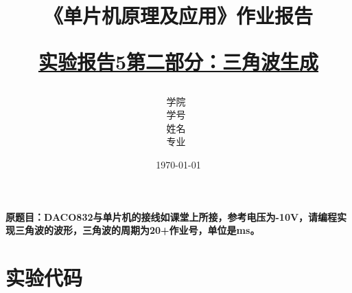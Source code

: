 \documentclass[12pt,hyperref,a4paper,UTF8]{ctexart}
\title{ 
        \vspace{1cm}
        \heiti \Huge \textbf{《单片机原理及应用》作业报告} \par
        \vspace{1cm} 
        \heiti \Large {\underline{实验报告5第二部分：三角波生成}   } 
        \vspace{3cm}
    
    }
\author{
        \vspace{0.5cm}
        \kaishu\Large 学院\ \dlmu[9cm]{卓越学院} \\ %
        \vspace{0.5cm}
        \kaishu\Large 学号\ \dlmu[9cm]{23040447} \\ %
        \vspace{0.5cm}
        \kaishu\Large 姓名\ \dlmu[9cm]{陈文轩} \qquad  \\ %
        \vspace{0.5cm}
        \kaishu\Large 专业\ \dlmu[9cm]{智能硬件与系统(电子信息工程)} \qquad \\ %
    }
\date{\today} %
\begin{document}
\cover
\thispagestyle{empty} %







\newpage
\setcounter{page}{1} %



\textbf{原题目：DACO832与单片机的接线如课堂上所接，参考电压为-10V，请编程实现三角波的波形，三角波的周期为20+作业号，单位是ms。}


\section{实验代码}
\end{document}
